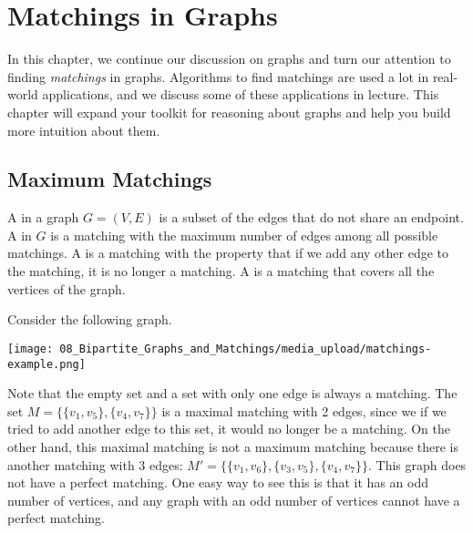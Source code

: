 \chapter{Matchings in Graphs}
\label{chapter:matchings-in-graphs}

\begin{preamble}
\label{prmbl:matchings-in-graphs::continue}
In this chapter, we continue our discussion on graphs and turn our attention to finding \emph{matchings} in graphs. Algorithms to find matchings are used a lot in real-world applications, and we discuss some of these applications in lecture. This chapter will expand your toolkit for reasoning about graphs and help you build more intuition about them.

\end{preamble}


\section{Maximum Matchings}
\label{sec:matchings-in-graphs::maximum-matchings}

\begin{flex}
\label{grp:definition:Matching----maximum-maximal-perfect}

\begin{definition}
\label{definition:Matching----maximum-maximal-perfect} 
A  in a graph $G=(V,E)$ is a subset of the edges that do not share an endpoint. A  in $G$ is a matching with the maximum number of edges among all possible matchings. A  is a matching with the property that if we add any other edge to the matching, it is no longer a matching. A  is a matching that covers all the vertices of the graph.

\end{definition}

\begin{example}
\label{example:Examples-of-matchings}
Consider the following graph.
\begin{center}
    \texttt{[image: 08\_Bipartite\_Graphs\_and\_Matchings/media\_upload/matchings-example.png]}
\end{center}
Note that the empty set and a set with only one edge is always a matching. The set $M = \{\{v_1, v_5\}, \{v_4,v_7\}\}$ is a maximal matching with 2 edges, since we if we tried to add another edge to this set, it would no longer be a matching. On the other hand, this maximal matching is not a maximum matching because there is another matching with 3 edges: $M' = \{ \{v_1,v_6\}, \{v_3,v_5\}, \{v_4,v_7\} \}$. This graph does not have a perfect matching. One easy way to see this is that it has an odd number of vertices, and any graph with an odd number of vertices cannot have a perfect matching. 

\end{example}
\end{flex}

